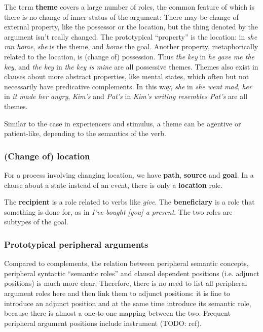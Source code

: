 \documentclass[UTF8, a4paper, oneside, scheme=plain]{ctexrep}
\newcommand*{\concept}[1]{\textbf{#1}}
\newcommand{\corpus}[1]{\emph{#1}}
\begin{document}
The term \concept{theme} covers a large number of roles,
the common feature of which is there is no change of inner status of the argument:
There may be change of external property, like the possessor or the location,
but the thing denoted by the argument isn't really changed.
The prototypical ``property'' is the location: 
in \corpus{she ran home}, \corpus{she} is the theme, and \corpus{home} the goal.
Another property, metaphorically related to the location, is (change of) possession.
Thus \corpus{the key} in \corpus{he gave me the key}, and \corpus{the key} in \corpus{the key is mine}
are all possessive themes.
Themes also exist in clauses about more abstract properties, like mental states, 
which often but not necessarily have predicative complements.
In this way, 
\corpus{she} in \corpus{she went mad}, 
\corpus{her} in \corpus{it made her angry},
\corpus{Kim's} and \corpus{Pat's} in \corpus{Kim's writing resembles Pat's}
are all themes.

Similar to the case in experiencers and stimulus,
a theme can be agentive or patient-like, depending to the semantics of the verb.

\subsubsection{(Change of) location}

For a process involving changing location,
we have \concept{path}, \concept{source} and \concept{goal}.
In a clause about a state instead of an event,
there is only a \concept{location} role.

The \concept{recipient} is a role related to verbs like \corpus{give}.
The \concept{beneficiary} is a role that something is done for,
as in \corpus{I've bought [you] a present}.
The two roles are subtypes of the goal.

\subsubsection{Prototypical peripheral arguments}

Compared to complements, the relation between peripheral semantic concepts,
peripheral syntactic ``semantic roles'' 
and clausal dependent positions (i.e. adjunct positions)
is much more clear. 
Therefore, there is no need to list all peripheral argument roles here 
and then link them to adjunct positions: 
it is fine to introduce an adjunct position and at the same time introduce its semantic role,
because there is almost a one-to-one mapping between the two.
Frequent peripheral argument positions include %
instrument (TODO: ref).
\end{document}
